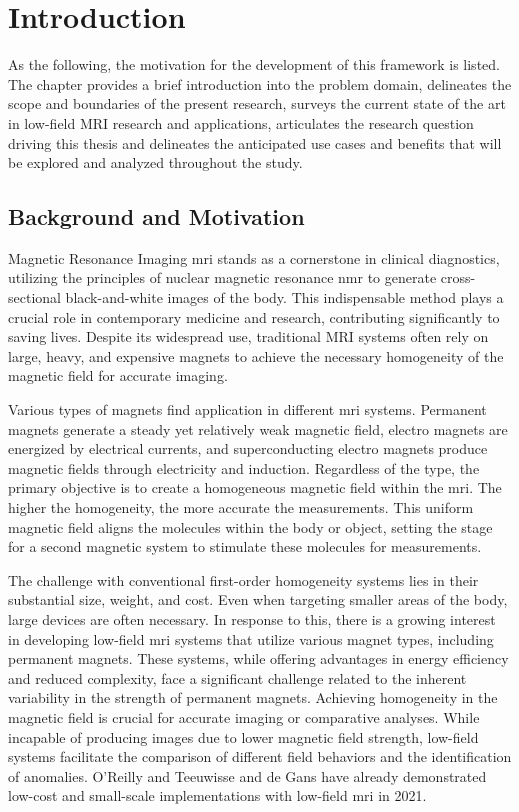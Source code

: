 \hypertarget{introduction}{%
\chapter{Introduction}\label{introduction}}

As the following, the motivation for the development of this framework
is listed. The chapter provides a brief introduction into the problem
domain, delineates the scope and boundaries of the present research,
surveys the current state of the art in low-field MRI research and
applications, articulates the research question driving this thesis and
delineates the anticipated use cases and benefits that will be explored
and analyzed throughout the study.

\hypertarget{background-and-motivation}{%
\section{Background and Motivation}\label{background-and-motivation}}

Magnetic Resonance Imaging \gls{mri} stands as a cornerstone in clinical
diagnostics, utilizing the principles of nuclear magnetic resonance
\gls{nmr} to generate cross-sectional black-and-white images of the
body. This indispensable method plays a crucial role in contemporary
medicine and research, contributing significantly to saving lives.
Despite its widespread use, traditional MRI systems often rely on large,
heavy, and expensive magnets to achieve the necessary homogeneity of the
magnetic field for accurate imaging. \cite{Nitz2016}

Various types of magnets find application in different \gls{mri}
systems. Permanent magnets generate a steady yet relatively weak
magnetic field, electro magnets are energized by electrical currents,
and superconducting electro magnets produce magnetic fields through
electricity and induction. Regardless of the type, the primary objective
is to create a homogeneous magnetic field within the \gls{mri}. The
higher the homogeneity, the more accurate the measurements. This uniform
magnetic field aligns the molecules within the body or object, setting
the stage for a second magnetic system to stimulate these molecules for
measurements.

The challenge with conventional first-order homogeneity systems lies in
their substantial size, weight, and cost. Even when targeting smaller
areas of the body, large devices are often necessary. In response to
this, there is a growing interest in developing low-field \gls{mri}
systems that utilize various magnet types, including permanent magnets.
These systems, while offering advantages in energy efficiency and
reduced complexity, face a significant challenge related to the inherent
variability in the strength of permanent magnets. Achieving homogeneity
in the magnetic field is crucial for accurate imaging or comparative
analyses. While incapable of producing images due to lower magnetic
field strength, low-field systems facilitate the comparison of different
field behaviors and the identification of anomalies. O'Reilly and
Teeuwisse and de Gans \cite{OReilly2019-rn} have already
demonstrated low-cost and small-scale implementations with low-field
\gls{mri} in 2021.

